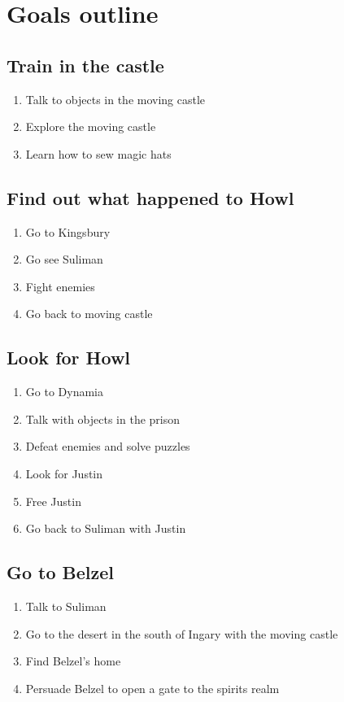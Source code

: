 \section{Goals outline}

\subsection{Train in the castle}
\begin{enumerate}
\item Talk to objects in the moving castle
\item Explore the moving castle
\item Learn how to sew magic hats
\end{enumerate}

\subsection{Find out what happened to Howl}
\begin{enumerate}
\item Go to Kingsbury
\item Go see Suliman
\item Fight enemies
\item Go back to moving castle
\end{enumerate}

\subsection{Look for Howl}
\begin{enumerate}
\item Go to Dynamia
\item Talk with objects in the prison
\item Defeat enemies and solve puzzles
\item Look for Justin
\item Free Justin
\item Go back to Suliman with Justin
\end{enumerate}

\subsection{Go to Belzel}
\begin{enumerate}
\item Talk to Suliman
\item Go to the desert in the south of Ingary with the moving castle
\item Find Belzel’s home
\item Persuade Belzel to open a gate to the spirits realm
\end{enumerate}

